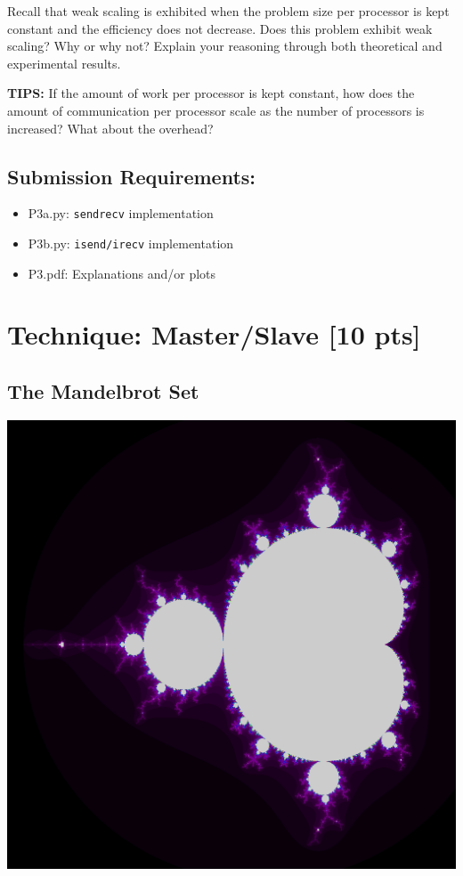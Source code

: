 \documentclass[12pt]{article}
\begin{document}
Recall that weak scaling is exhibited when the problem size per processor is kept constant and the efficiency does not decrease.  Does this problem exhibit weak scaling?  Why or why not?  Explain your reasoning through both theoretical and experimental results.

\textbf{TIPS:} If the amount of work per processor is kept constant, how does the amount of communication per processor scale as the number of processors is increased?  What about the overhead?

\subsection*{Submission Requirements:}
\begin{itemize}
\item P3a.py: \texttt{sendrecv} implementation
\item P3b.py: \texttt{isend/irecv} implementation
\item P3.pdf: Explanations and/or plots
\end{itemize}

\pagebreak

\section{Technique: Master/Slave [10 pts]}

\subsection*{The Mandelbrot Set}

\begin{center}
\includegraphics[scale=0.25]{Mandelbrot}
\end{center}
\end{document}
